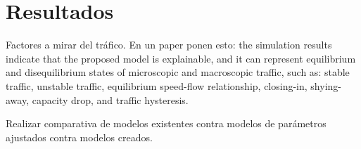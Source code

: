 \section{Resultados}
\label{ch:behavior-models-study:results}

Factores a mirar del tráfico. En un paper ponen esto: the simulation  results indicate that the proposed model is explainable, and it can represent equilibrium and disequilibrium states of microscopic and macroscopic traffic, such as: stable traffic, unstable traffic, equilibrium speed-flow relationship, closing-in, shying-away, capacity drop, and traffic hysteresis.

Realizar comparativa de modelos existentes contra modelos de parámetros ajustados contra modelos creados.